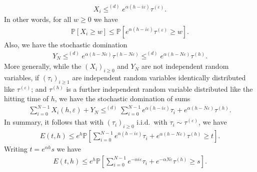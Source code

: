 \documentclass[a4,12pt]{amsart}
\numberwithin{equation}{section}
\begin{document}
		\begin{align*}
			X_i \leq^{(d)} e^{ \alpha(h-i\varepsilon) } \tau^{(\varepsilon)}.
		\end{align*}
		In other words, for all $w \geq 0$ we have
		\begin{align*}
			\mathbb{P}[ X_i  \geq w  ] \leq 
			\mathbb{P} \left[ e^{ \alpha(h-i\varepsilon) } \tau^{(\varepsilon)}\geq w \right].
		\end{align*}
		Also, we have the stochastic domination 
		\begin{align*}
			Y_N \leq^{(d)} e^{\alpha(h-N\varepsilon)} \tau^{(h-N\varepsilon)} 
			\leq^{(d)} e^{\alpha(h-N\varepsilon)} \tau^{(h)}.
		\end{align*}
		More generally, while the $(X_i)_{i \geq 0}$ and $Y_N$ are not independent random variables, 
		if $(\tau_i)_{i \geq 1}$ are independent random variables 
		identically distributed like $\tau^{(\varepsilon)}$; and $\tau^{(h)}$ is a further 
		independent random variable distributed like the hitting time of $h$, 
		we have the stochastic domination of sums
		\begin{align*}
			\sum_{i = 0}^{N-1} X_i(h,\varepsilon) + Y_N \leq^{(d)} 
			\sum_{i = 0}^{N-1 } e^{\alpha(h-i\varepsilon)} \tau_i + e^{\alpha(h-N\varepsilon)} \tau^{(h)}.
		\end{align*} 
		In summary, it follows that with $(\tau_i)_{i \geq 0}$ 
		i.i.d.\ with $\tau_i \sim \tau^{(\varepsilon)}$, we have 
		\begin{align*} 
			E(t,h) \leq e^h 
			\mathbb{P} 
			\left[\sum_{i = 0}^{N-1 } e^{\alpha(h-i\varepsilon)} \tau_i + e^{\alpha(h-N\varepsilon)} \tau^{(h)} \geq t \right].  
	\end{align*}
	Writing $t = e^{\alpha h} s$ we have 
	\begin{align*} 
		E(t,h)  \leq e^h \mathbb{P} 
		\left[\sum_{i = 0}^{N-1 } e^{ -\alpha i\varepsilon} \tau_i + e^{- \alpha N\varepsilon} \tau^{(h)} \geq s \right].  
	\end{align*}
\end{document}
